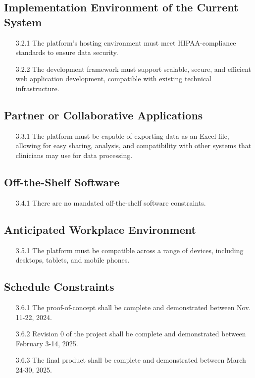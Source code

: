 \documentclass[12pt]{article}
\begin{document}
\subsection{Implementation Environment of the Current System}
\begin{itemize}
  \item[3.2.1] The platform’s hosting environment must meet HIPAA-compliance standards to ensure data security.
  \item[3.2.2] The development framework must support scalable, secure, and efficient web application development, compatible with existing technical 
  infrastructure.
\end{itemize}
\subsection{Partner or Collaborative Applications}
\begin{itemize}
  \item[3.3.1] The platform must be capable of exporting data as an Excel file, allowing for easy sharing, analysis, and compatibility with other systems
  that clinicians may use for data processing.
\end{itemize}
\subsection{Off-the-Shelf Software}
\begin{itemize}
  \item[3.4.1] \color{red} There are no mandated off-the-shelf software constraints. \color{black}
\end{itemize}
\subsection{Anticipated Workplace Environment}
\begin{itemize}
  \item[3.5.1] The platform must be compatible across a range of devices, including desktops, tablets, and mobile phones.
\end{itemize}
\subsection{Schedule Constraints}
\begin{itemize}
  \item[3.6.1] The proof-of-concept shall be complete and demonstrated between Nov. 11-22, 2024.
  \item[3.6.2] Revision 0 of the project shall be complete and demonstrated between February 3-14, 2025.
  \item[3.6.3] The final product shall be complete and demonstrated between March 24-30, 2025.
\end{itemize}
\end{document}
